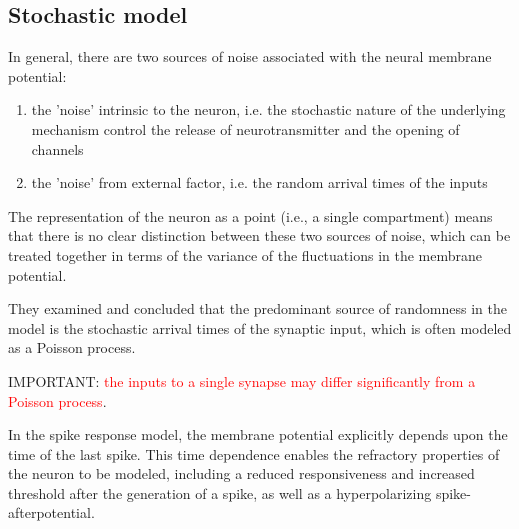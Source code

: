 \subsection{Stochastic model}

In general, there are two sources of noise associated with
the neural membrane potential:
\begin{enumerate}
  \item the 'noise' intrinsic to the neuron, i.e. the stochastic nature of the
  underlying mechanism control the release of neurotransmitter and the opening
  of channels
  
  \item the 'noise' from external factor, i.e. the  random arrival times
of the inputs
\end{enumerate}

The representation of the neuron as a point
(i.e., a single compartment) means that there is no clear distinction
between these two sources of noise, which can be
treated together in terms of the variance of the fluctuations in
the membrane potential.

They examined and concluded that the predominant source of randomness in the
model is the stochastic arrival times of the synaptic input, which is 
often modeled as a Poisson process.

IMPORTANT: \textcolor{red}{the inputs to a single synapse may differ significantly from a
Poisson process}.

In the spike
response model, the membrane potential explicitly depends
upon the time of the last spike. This time dependence enables
the refractory properties of the neuron to be modeled,
including a reduced responsiveness and increased threshold
after the generation of a spike, as well as a hyperpolarizing
spike-afterpotential.


